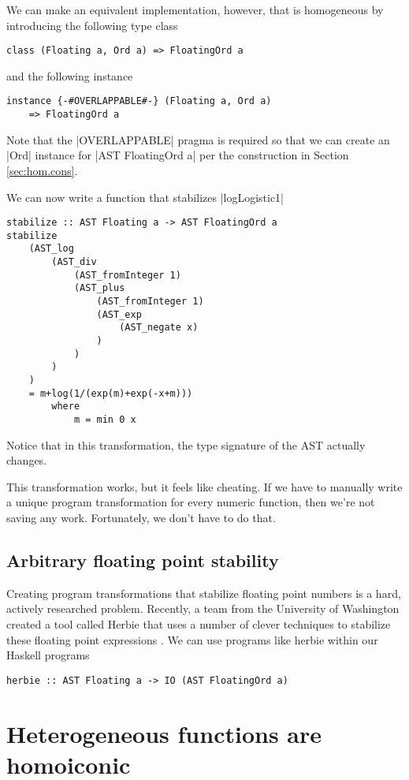 \documentclass[preprint]{sigplanconf}
\theoremstyle{definition}
\begin{document}
We can make an equivalent implementation, however, that is homogeneous by introducing the following type class
\begin{lstlisting}
class (Floating a, Ord a) => FloatingOrd a
\end{lstlisting}
and the following instance
\begin{lstlisting}
instance {-#OVERLAPPABLE#-} (Floating a, Ord a)
    => FloatingOrd a
\end{lstlisting}
Note that the |OVERLAPPABLE| pragma is required so that we can create an |Ord| instance for |AST FloatingOrd a| per the construction in Section \ref{sec:hom.cons}.

We can now write a function that stabilizes |logLogistic1|
\begin{lstlisting}
stabilize :: AST Floating a -> AST FloatingOrd a
stabilize
    (AST_log
        (AST_div
            (AST_fromInteger 1)
            (AST_plus
                (AST_fromInteger 1)
                (AST_exp
                    (AST_negate x)
                )
            )
        )
    )
    = m+log(1/(exp(m)+exp(-x+m)))
        where
            m = min 0 x
\end{lstlisting}
Notice that in this transformation, the type signature of the AST actually changes.

This transformation works, but it feels like cheating.
If we have to manually write a unique program transformation for every numeric function,
then we're not saving any work.
Fortunately, we don't have to do that.

\subsection{Arbitrary floating point stability}

Creating program transformations that stabilize floating point numbers is a hard,
actively researched problem.
Recently, a team from the University of Washington created a tool called Herbie that uses a number of clever techniques to stabilize these floating point expressions \cite{panchekha2015automatically}.
We can use programs like herbie within our Haskell programs

\begin{lstlisting}
herbie :: AST Floating a -> IO (AST FloatingOrd a)
\end{lstlisting}

\section{Heterogeneous functions are homoiconic}
\end{document}
